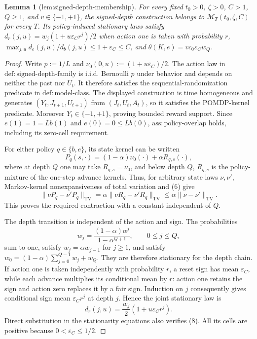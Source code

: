 \documentclass{article}
\newtheorem{lemma}{Lemma}
\begin{document}
\begin{lemma}[lem:signed-depth-membership]\label{lem:signed-depth-membership}
For every fixed \(t_0>0\), \(\zeta>0\), \(C>1\), \(Q\ge1\), and \(v\in\{-1,+1\}\), the signed-depth construction belongs to \(\mathcal M_T(t_0,\zeta,C)\) for every \(T\). Its policy-induced stationary laws satisfy \(d_r(j,u)=w_j(1+u\varepsilon_C r^j)/2\) when action one is taken with probability \(r\), \(\max_{j,u}d_e(j,u)/d_b(j,u)\le1+\varepsilon_C\le C\), and \(\theta(K,e)=vc_0\varepsilon_Cw_Q\).
\end{lemma}
\begin{proof}
Write \(p:=1/L\) and \(\nu_0(0,u):=(1+u\varepsilon_C)/2\).  The action law in \(\mathrm{def{:}signed\text{-}depth\text{-}family}\) is i.i.d. Bernoulli \(p\) under behavior and depends on neither the past nor \(U_t\).  It therefore satisfies the sequential-randomization predicate in \(\mathrm{def{:}model\text{-}class}\).  The displayed construction is time homogeneous and generates \((Y_t,J_{t+1},U_{t+1})\) from \((J_t,U_t,A_t)\), so it satisfies the POMDP-kernel predicate.  Moreover \(Y_t\in\{-1,+1\}\), proving bounded reward support.  Since \(e(1)=1=Lb(1)\) and \(e(0)=0\le Lb(0)\), \(\mathrm{ass{:}policy\text{-}overlap}\) holds, including its zero-cell requirement.

For either policy \(q\in\{b,e\}\), its state kernel can be written
\[
 P_q(s,\cdot)=(1-\alpha)\nu_0(\cdot)+\alpha R_{q,s}(\cdot), \tag{6}
\]
where at depth \(Q\) one may take \(R_{q,s}=\nu_0\), and below depth \(Q\), \(R_{q,s}\) is the policy-mixture of the one-step advance kernels.  Thus, for arbitrary state laws \(\nu,\nu'\), Markov-kernel nonexpansiveness of total variation and (6) give
\[
 \|\nu P_q-\nu'P_q\|_{\mathrm{TV}}
 =\alpha\|\nu R_q-\nu'R_q\|_{\mathrm{TV}}
 \le\alpha\|\nu-\nu'\|_{\mathrm{TV}}. \tag{7}
\]
This proves the required contraction with a constant independent of \(Q\).

The depth transition is independent of the action and sign.  The probabilities
\[
 w_j=\frac{(1-\alpha)\alpha^j}{1-\alpha^{Q+1}},\qquad 0\le j\le Q,
\]
sum to one, satisfy \(w_j=\alpha w_{j-1}\) for \(j\ge1\), and satisfy
\(w_0=(1-\alpha)\sum_{j=0}^{Q-1}w_j+w_Q\).  They are therefore stationary for the depth chain.  If action one is taken independently with probability \(r\), a reset sign has mean \(\varepsilon_C\), while each advance multiplies its conditional mean by \(r\): action one retains the sign and action zero replaces it by a fair sign.  Induction on \(j\) consequently gives conditional sign mean \(\varepsilon_Cr^j\) at depth \(j\).  Hence the joint stationary law is
\[
 d_r(j,u)=\frac{w_j}{2}(1+u\varepsilon_Cr^j). \tag{8}
\]
Direct substitution in the stationarity equations also verifies (8).  All its cells are positive because \(0<\varepsilon_C\le1/2\).


\end{proof}
\end{document}
